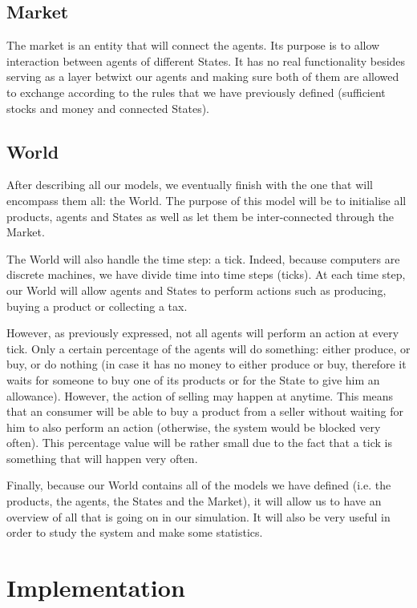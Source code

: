 \subsection{Market}\label{section:market}
The market is an entity that will connect the agents. Its purpose is to allow interaction between agents of different States. It has no real functionality besides serving as a layer betwixt our agents and making sure both of them are allowed to exchange according to the rules that we have previously defined (sufficient stocks and money and connected States).

\subsection{World}\label{section:world}
After describing all our models, we eventually finish with the one that will encompass them all: the World. The purpose of this model will be to initialise all products, agents and States as well as let them be inter-connected through the Market.

The World will also handle the time step: a tick. Indeed, because computers are discrete machines, we have divide time into time steps (ticks). At each time step, our World will allow agents and States to perform actions such as producing, buying a product or collecting a tax.

However, as previously expressed, not all agents will perform an action at every tick. Only a certain percentage of the agents will do something: either produce, or buy, or do nothing (in case it has no money to either produce or buy, therefore it waits for someone to buy one of its products or for the State to give him an allowance). However, the action of selling may happen at anytime. This means that an consumer will be able to buy a product from a seller without waiting for him to also perform an action (otherwise, the system would be blocked very often).
This percentage value will be rather small due to the fact that a tick is something that will happen very often.

Finally, because our World contains all of the models we have defined (i.e. the products, the agents, the States and the Market), it will allow us to have an overview of all that is going on in our simulation. It will also be very useful in order to study the system and make some statistics.





\section{Implementation}\label{section:implementation}


